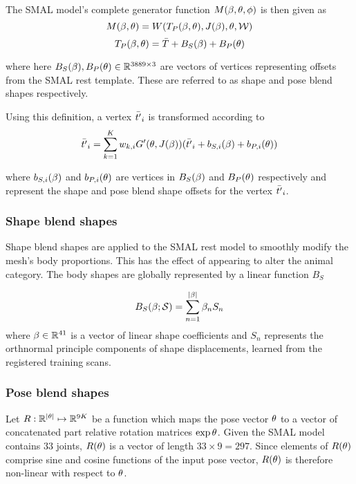 The SMAL model's complete generator function $M(\beta, \theta, \phi)$ is then given as 
\begin{equation}
    M(\beta,\theta) = W(T_{P}(\beta, \theta), J(\beta), \theta, \mathcal{W})
\end{equation}
\begin{equation}
    T_{P}(\beta,\theta) = \bar{T} + B_{S}(\beta) + B_{P}(\theta)
\end{equation}

where here $B_{S}(\beta), B_{P}(\theta) \in {\mathbb{R}^{3889 \times 3}}$ are vectors of vertices representing offsets from the SMAL rest template. These are referred to as shape and pose blend shapes respectively.

Using this definition, a vertex $\bar{t'}_{i}$ is transformed according to 
\begin{equation}
    \bar{t'}_{i} = \sum_{k=1}^{K} w_{k,i} G'(\theta,J(\beta))(\bar{t'}_{i} + b_{S,i}(\beta) + b_{P,i}(\theta))
\end{equation}

where $b_{S,i}(\beta)$ and $b_{P, i}(\theta)$ are vertices in $B_{S}(\beta)$ and $B_{P}(\theta)$ respectively and represent the shape and pose blend shape offsets for the vertex $\bar{t'}_{i}$.

\subsubsection{Shape blend shapes}

Shape blend shapes are applied to the SMAL rest model to smoothly modify the mesh's body proportions. This has the effect of appearing to alter the animal category. The body shapes are globally represented by a linear function $B_{S}$

\begin{equation}
    B_{S}(\beta;\mathcal{S}) = \sum_{n=1}^{|\beta|}\beta_{n}S_{n}
\end{equation}
where $\beta \in {\mathbb{R}^{41}}$ is a vector of linear shape coefficients and $S_{n}$ represents the orthnormal principle components of shape displacements, learned from the registered training scans. 


\subsubsection{Pose blend shapes}

Let $R: {\mathbb{R}^{|\theta|}} \mapsto {\mathbb{R}^{9K}}$ be a function which maps the pose vector $\theta$ to a vector of concatenated part relative rotation matrices $\exp{\theta}$. Given the SMAL model contains $33$ joints, $R(\theta)$ is a vector of length $33 \times 9 = 297$. Since elements of $R(\theta)$ comprise sine and cosine functions of the input pose vector, $R(\theta)$ is therefore non-linear with respect to $\theta$.

